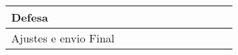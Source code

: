 {\begin{tabular}{|l|llllllllll|}
    \\ \hline
    Defesa &
    \multicolumn{1}{l|}{} &
    \multicolumn{1}{l|}{} &
    \multicolumn{1}{l|}{} &
    \multicolumn{1}{l|}{} &
    \multicolumn{1}{l|}{} &
    \multicolumn{1}{l|}{} &
    \multicolumn{1}{l|}{} &
    \multicolumn{1}{l|}{} &
    \multicolumn{1}{l|}{\cellcolor[HTML]{C0C0C0}} &
    \\ \hline
    Ajustes e envio Final &
    \multicolumn{1}{l|}{} &
    \multicolumn{1}{l|}{} &
    \multicolumn{1}{l|}{} &
    \multicolumn{1}{l|}{} &
    \multicolumn{1}{l|}{} &
    \multicolumn{1}{l|}{} &
    \multicolumn{1}{l|}{} &
    \multicolumn{1}{l|}{} &
    \multicolumn{1}{l|}{\cellcolor[HTML]{C0C0C0}} & \cellcolor[HTML]{C0C0C0}
    \\ \hline
    \end{tabular}%
    }